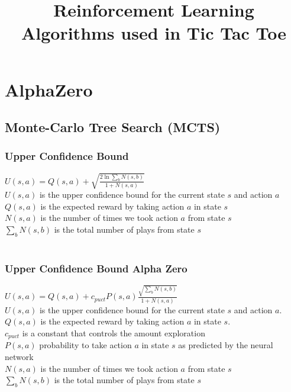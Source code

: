 \documentclass{article}
\title{Reinforcement Learning Algorithms used in Tic Tac Toe}
\begin{document}
\maketitle


\section{AlphaZero}
\subsection{Monte-Carlo Tree Search (MCTS)}
\subsubsection{Upper Confidence Bound}
$ U(s,a) = Q(s,a) + \sqrt{\frac{2\ln{\sum\nolimits_{b}N(s,b)}}{1 + N(s,a)}}$ \\

\noindent
$U(s,a)$ is the upper confidence bound for the current state $s$ and action $a$ \\
$Q(s,a)$ is the expected reward by taking action $a$ in state $s$ \\
$N(s,a)$ is the number of times we took action $a$ from state $s$ \\
$\sum\nolimits_{b}N(s,b)$ is the total number of plays from state $s$ \\
\\


\subsubsection{Upper Confidence Bound Alpha Zero}
\noindent 
$ U(s,a) = Q(s,a) + c_{puct} P(s,a) \frac{\sqrt{\sum\nolimits_{b}N(s,b)}}{1 + N(s,a)}$ \\

\noindent 
$U(s,a)$ is the upper confidence bound for the current state $s$ and action $a$. \\
$Q(s,a)$ is the expected reward by taking action $a$ in state $s$. \\
$c_{puct}$ is a constant that controls the amount exploration \\ 
$P(s,a)$ probability to take action $a$ in state $s$ as predicted by the neural network \\
$N(s,a)$ is the number of times we took action $a$ from state $s$ \\
$\sum\nolimits_{b}N(s,b)$ is the total number of plays from state $s$ \\
\\
\pagebreak
\end{document}

